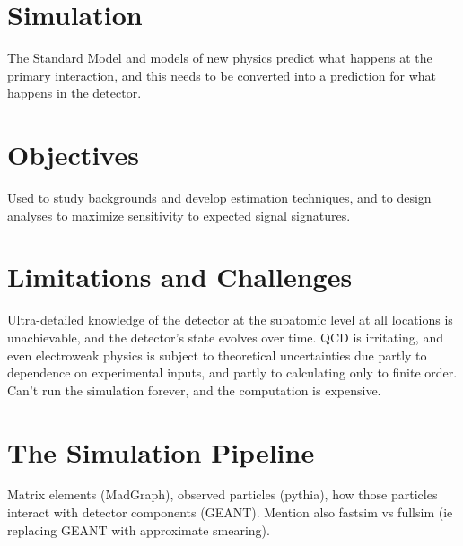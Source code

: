 \section{Simulation} \label{sec:simulation}

  The Standard Model and models of new physics predict what happens at the primary interaction, and this needs to be converted into a prediction for what happens in the detector.

  \section{Objectives} \label{sec:objectives}

  Used to study backgrounds and develop estimation techniques, and to design analyses to maximize sensitivity to expected signal signatures.

  \section{Limitations and Challenges} \label{sec:limitations}

  Ultra-detailed knowledge of the detector at the subatomic level at all locations is unachievable, and the detector's state evolves over time.
  QCD is irritating, and even electroweak physics is subject to theoretical uncertainties due partly to dependence on experimental inputs, and partly to calculating only to finite order.
  Can't run the simulation forever, and the computation is expensive.

  \section{The Simulation Pipeline} \label{sec:pipeline}

  Matrix elements (MadGraph), observed particles (pythia), how those particles interact with detector components (GEANT).
  Mention also fastsim vs fullsim (ie replacing GEANT with approximate smearing).
